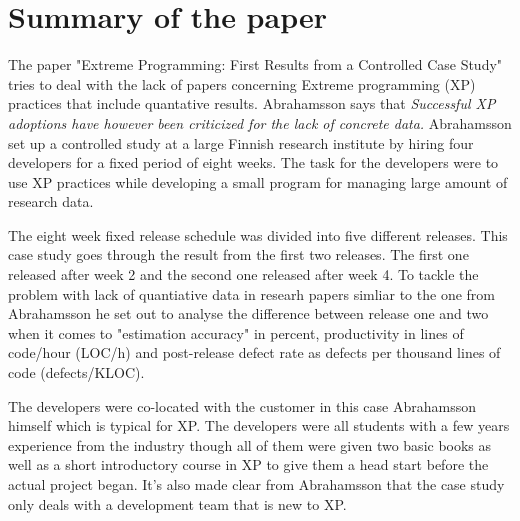 \newpage
\section{Summary of the paper}
The paper "Extreme Programming: First Results from a Controlled Case Study"
\cite{abrahamsson2003} tries to deal with the lack of papers concerning Extreme
programming (XP) practices that include quantative results. Abrahamsson says that
{\em Successful XP adoptions have however been criticized for the lack of
concrete data.} Abrahamsson set up a controlled study at a large Finnish
research institute by hiring four developers for a fixed period of eight weeks.
The task for the developers were to use XP practices while developing a small
program for managing large amount of research data.

The eight week fixed release schedule was divided into five different releases.
This case study goes through the result from the first two releases. The first
one released after week 2 and the second one released after week 4. To tackle
the problem with lack of quantiative data in researh papers simliar to the one
from Abrahamsson he set out to analyse the difference between release one and
two when it comes to "estimation accuracy" in percent, productivity in lines of
code/hour (LOC/h) and post-release defect rate as defects per thousand lines of
code (defects/KLOC).

The developers were co-located with the customer in this case Abrahamsson
himself which is typical for XP. The developers were all students with a few
years experience from the industry though all of them were given two basic
books as well as a short introductory course in XP to give them a head start
before the actual project began. It's also made clear from Abrahamsson that
the case study only deals with a development team that is new to XP.
